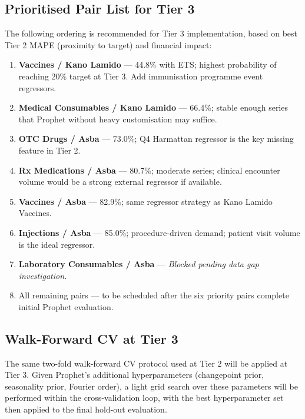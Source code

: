 \documentclass[12pt, a4paper]{article}
\begin{document}
\subsection{Prioritised Pair List for Tier 3}

The following ordering is recommended for Tier 3 implementation,
based on best Tier 2 MAPE (proximity to target) and financial impact:

\begin{enumerate}[leftmargin=1.5em, itemsep=5pt]
  \item \textbf{Vaccines / Kano Lamido} --- 44.8\% with ETS; highest
        probability of reaching 20\% target at Tier 3. Add immunisation
        programme event regressors.
  \item \textbf{Medical Consumables / Kano Lamido} --- 66.4\%; stable
        enough series that Prophet without heavy customisation may suffice.
  \item \textbf{OTC Drugs / Asba} --- 73.0\%; Q4 Harmattan regressor
        is the key missing feature in Tier 2.
  \item \textbf{Rx Medications / Asba} --- 80.7\%; moderate series;
        clinical encounter volume would be a strong external regressor
        if available.
  \item \textbf{Vaccines / Asba} --- 82.9\%; same regressor strategy
        as Kano Lamido Vaccines.
  \item \textbf{Injections / Asba} --- 85.0\%; procedure-driven demand;
        patient visit volume is the ideal regressor.
  \item \textbf{Laboratory Consumables / Asba} --- \textit{Blocked
        pending data gap investigation.}
  \item All remaining pairs --- to be scheduled after the six
        priority pairs complete initial Prophet evaluation.
\end{enumerate}

\subsection{Walk-Forward CV at Tier 3}

The same two-fold walk-forward CV protocol used at Tier 2 will be applied
at Tier 3. Given Prophet's additional hyperparameters (changepoint prior,
seasonality prior, Fourier order), a light grid search over these
parameters will be performed within the cross-validation loop, with
the best hyperparameter set then applied to the final hold-out evaluation.
\end{document}
